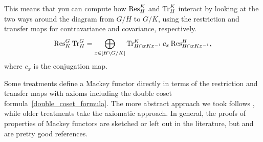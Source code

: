 This means that you can compute how $\operatorname{Res}_H^K$ and $\operatorname{Tr}_H^K$ interact by looking at the two ways around the
diagram from $G/H$ to $G/K$, using the restriction and transfer maps for contravariance and covariance,
respectively.
\begin{equation}
\label{double_coset_formula}
\operatorname{Res}_K^G\operatorname{Tr}_H^G = \bigoplus_{x\in [H\backslash G/K]} \operatorname{Tr}_{H\cap xKx^{-1}}^K c_x\operatorname{Res}_{H\cap xKx^{-1}}^H,
\end{equation}
where $c_x$ is the conjugation map.
\begin{rem}
Some treatments define a Mackey functor directly in terms of the restriction and transfer maps with axioms
including the double coset formula~\eqref{double_coset_formula}. The more abstract approach we took follows
\cite{Dress}, while older treatments take the axiomatic approach. In general, the proofs of properties of Mackey
functors are sketched or left out in the literature, but \cite{Webb} and  are pretty good
references.
\end{rem}
